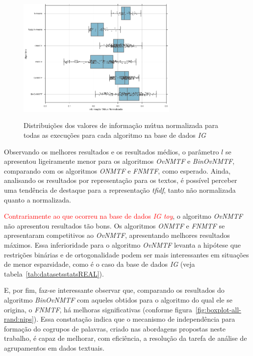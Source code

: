 \documentclass[
    12pt,                %
    oneside,            %
    a4paper,            %
    english,            %
    brazil                %
    ]{abntex2ppgsi}
\begin{document}
\begin{figure}[H]
    \centering
    \caption{Distribuições dos valores de informação mútua normalizada para todas as execuções para cada algoritmo na base de dados \textit{IG}}
    \includegraphics[width=0.7\textwidth]{img/boxplot-all-nmi-nips.png}
    \label{fig:boxplot-all-nmi:nips}
\end{figure}

Observando os melhores resultados e os resultados médios, o parâmetro $l$ se apresentou ligeiramente menor para os algoritmos \textit{OvNMTF} e \textit{BinOvNMTF}, comparando com os algoritmos \textit{ONMTF} e \textit{FNMTF}, como esperado. Ainda, analisando os resultados por representação para os textos, é possível perceber uma tendência de destaque para a representação \textit{tfidf}, tanto não normalizada quanto a normalizada.


\textcolor{red}{Contrariamente ao que ocorreu na base de dados \textit{IG toy}}, o algoritmo \textit{OvNMTF} não apresentou resultados tão bons. Os algoritmos \textit{ONMTF} e \textit{FNMTF} se apresentaram competitivos ao \textit{OvNMTF}, apresentando melhores resultados máximos. Essa inferioridade para o algoritmo \textit{OvNMTF} levanta a hipótese que restrições binárias e de ortogonalidade podem ser mais interessantes em situações de menor esparsidade, como é o caso da base de dados \textit{IG} (veja tabela~\ref{tab:datasetsstatsREAL}).

E, por fim, faz-se interessante observar que, comparando os resultados do algoritmo \textit{BinOvNMTF} com aqueles obtidos para o algoritmo do qual ele se origina, o \textit{FNMTF}, há melhoras significativas (conforme figura~\ref{fig:boxplot-all-rand:nips}). Essa constatação indica que o mecanismo de independência para formação do cogrupos de palavras, criado nas abordagens propostas neste trabalho, é capaz de melhorar, com eficiência, a resolução da tarefa de análise de agrupamentos em dados textuais.
\end{document}
